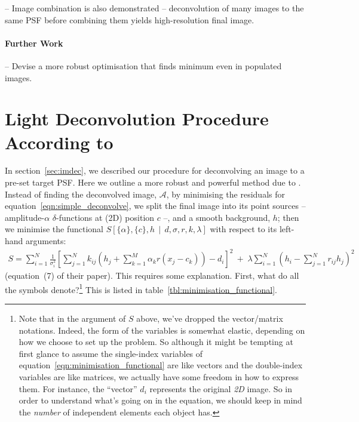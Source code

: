 \documentclass[letterpaper, 11pt]{article}
\begin{document}
-- Image combination is also demonstrated -- deconvolution of many images to the same PSF before combining them yields 
high-resolution final image.


\paragraph{Further Work}

-- Devise a more robust optimisation that finds minimum even in populated images.



\section{Light Deconvolution Procedure According to \citet{MCS98}}
\label{sec:MCS98procedure}

In section~\ref{sec:imdec}, we described our procedure for deconvolving an image to a pre-set target PSF. Here we outline a more robust and powerful method due to \citet{MCS98}. Instead of finding the deconvolved image, $\mathcal A$, by minimising the residuals for equation~\ref{eqn:simple_deconvolve}, we split the final image into its point sources -- amplitude-$\alpha$ $\delta$-functions at (2D) position $c$ --, and a smooth background, $h$; then we minimise the functional $S\left[\{\alpha\},\{c\}, h \,\middle|\, {d}, {\sigma}, {r}, {k}, \lambda \right]$ with respect to its left-hand arguments:
\begin{align}
	S = \sum_{i=1}^N \frac{1}{\sigma_i^2} \left[ \sum_{j=1}^N k_{ij} \left(h_j +\sum_{k=1}^M \alpha_k r(x_j-c_k)\right) - d_i \right]^2\
			+\; \lambda\sum_{i=1}^N \left( h_i - \sum_{j=1}^N r_{ij}h_j \right)^2 \label{eqn:minimisation_functional}
\end{align}
(equation~(7) of their paper). This requires some explanation. First, what do all the symbols denote?\footnote{Note that in the argument of $S$ above, we've dropped the vector/matrix notations. Indeed, the form of the variables is somewhat elastic, depending on how we choose to set up the problem. So although it might be tempting at first glance to assume the single-index variables of equation~\ref{eqn:minimisation_functional} are like vectors and the double-index variables are like matrices, we actually have some freedom in how to express them. For instance, the ``vector'' $d_i$ represents the original \emph{2D} image. So in order to understand what's going on in the equation, we should keep in mind the \emph{number} of independent elements each object has.} This is listed in table~\ref{tbl:minimisation_functional}.
\end{document}
